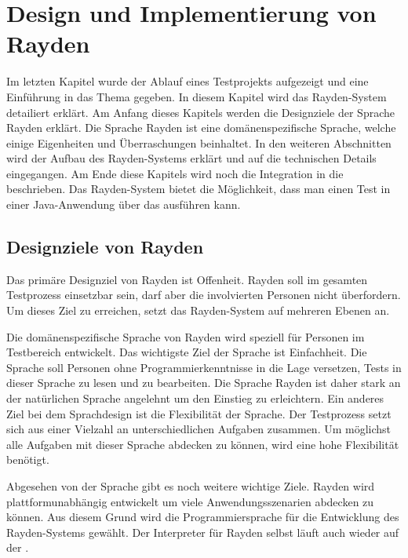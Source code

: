 \chapter{Design und Implementierung von Rayden}
\label{cha:DesignUndImplementierung}

Im letzten Kapitel wurde der Ablauf eines Testprojekts aufgezeigt und eine Einführung in das Thema  gegeben. In diesem Kapitel wird das Rayden-System detailiert erklärt. Am Anfang dieses Kapitels werden die Designziele der Sprache Rayden erklärt. Die Sprache Rayden ist eine domänenspezifische Sprache, welche einige Eigenheiten und Überraschungen beinhaltet. In den weiteren Abschnitten wird der Aufbau des Rayden-Systems erklärt und auf die technischen Details eingegangen. Am Ende diese Kapitels wird noch die Integration in die \cite{JavaScriptApi} beschrieben. Das Rayden-System bietet die Möglichkeit, dass man einen Test in einer Java-Anwendung über das  ausführen kann.


\section{Designziele von Rayden}

Das primäre Designziel von Rayden ist Offenheit. Rayden soll im gesamten Testprozess einsetzbar sein, darf aber die involvierten Personen nicht überfordern. Um dieses Ziel zu erreichen, setzt das Rayden-System auf mehreren Ebenen an.

\SuperPar
Die domänenspezifische Sprache von Rayden wird speziell für Personen im Testbereich entwickelt. Das wichtigste Ziel der Sprache ist Einfachheit. Die Sprache soll Personen ohne Programmierkenntnisse in die Lage versetzen, Tests in dieser Sprache zu lesen und zu bearbeiten. Die Sprache Rayden ist daher stark an der natürlichen Sprache angelehnt um den Einstieg zu erleichtern. Ein anderes Ziel bei dem Sprachdesign ist die Flexibilität der Sprache. Der Testprozess setzt sich aus einer Vielzahl an unterschiedlichen Aufgaben zusammen. Um möglichst alle Aufgaben mit dieser Sprache abdecken zu können, wird eine hohe Flexibilität benötigt. 

\SuperPar
Abgesehen von der Sprache gibt es noch weitere wichtige Ziele. Rayden wird plattformunabhängig entwickelt um viele Anwendungsszenarien abdecken zu können. Aus diesem Grund wird die Programmiersprache  für die Entwicklung des Rayden-Systems gewählt. Der Interpreter für Rayden selbst läuft auch wieder auf der .

